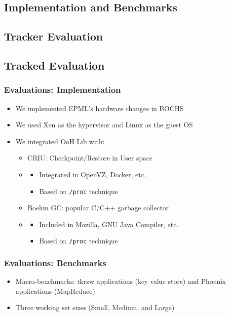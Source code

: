 \documentclass[xcolor=table,bigger,unknownkeysallowed]{beamer}
\begin{document}
\subsection{Implementation and Benchmarks}
\subsection{Tracker Evaluation}
\subsection{Tracked Evaluation}
\begin{frame}
	\frametitle{Evaluations: Implementation}
	\begin{itemize}
		\item We implemented EPML's hardware changes in BOCHS				
		\item We used Xen as the hypervisor and Linux as the guest OS
		\item We integrated OoH Lib with: %
		\begin{itemize}
			\item[\ding{118}] CRIU: Checkpoint/Restore in User space
			\item[] \begin{itemize}
				\item Integrated in OpenVZ, Docker, etc.
				\item Based on \texttt{/proc} technique
			\end{itemize}
			\item[\ding{118}] Boehm GC: popular C/C++ garbage collector
			\item[] \begin{itemize}
				\item Included in Mozilla, GNU Java Compiler, etc.
				\item Based on \texttt{/proc} technique
			\end{itemize}
		\end{itemize}
	\end{itemize}
\end{frame}
\begin{frame}
	\frametitle{Evaluations: Benchmarks}
	\begin{itemize}
		\item Macro-benchmarks: tkrzw applications (key value store) and Phoenix applications (MapReduce)
		\item Three working set sizes (Small, Medium, and Large)
	\end{itemize}
\end{frame}  
\end{document}
